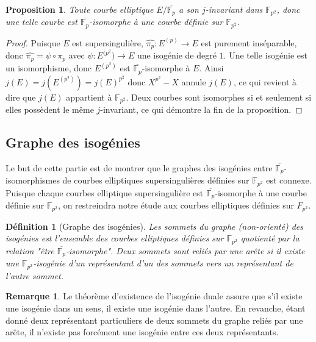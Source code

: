 \documentclass{article}
\theoremstyle{plain}%
\newtheorem{prop}[thm]{Proposition}
\newtheorem{deff}[thm]{Définition}
\theoremstyle{definition}%
\newtheorem{rem}[thm]{Remarque}
\newcommand{\F}{\mathbb{F}}
\newcommand{\h}{\widehat}
\newcommand{\ol}{\overline}
\begin{document}
\begin{prop}
  \label{j-p2}
  Toute courbe elliptique $E/\overline{\F_p}$ a son $j$-invariant dans $\F_{p^2}$, donc une telle courbe est $\overline{\F_p}$-isomorphe à une courbe définie sur $\F_{p^2}$. 
\end{prop}

\begin{proof}
  Puisque $E$ est supersingulière, $\h{\pi_p} : E^{(p)} \to  E$ est purement inséparable, donc $\h{\pi_p} = \psi \circ \pi_p$ avec $\psi : E^{(p^2}) \to E$ une isogénie de degré $1$. Une telle isogénie est un isomorphisme, donc $ E^{(p^2)} $ est $\ol{\F_p}$-isomorphe à $E$. Ainsi $j(E) = j( E^{(p^2)} ) = j(E)^{p^2}$ donc $X^{p^2} - X$ annule $j(E)$, ce qui revient à dire que $j(E)$ appartient à $\F_{p^2}$.
Deux courbes sont isomorphes si et seulement si elles possèdent le même $j$-invariant, ce qui démontre la fin de la proposition.
\end{proof}

\subsection{Graphe des isogénies}

Le but de cette partie est de montrer que le graphes des isogénies entre $\overline{\F_p}$-isomorphismes de courbes elliptiques supersingulières définies sur $\F_{p^2}$ est connexe. Puisque chaque courbes elliptique supersingulière est $\ol{\F_p}$-isomorphe à une courbe définie sur $\F_{p^2}$, on restreindra notre étude aux courbes elliptiques définies sur $F_{p^2}$.


\begin{deff}[Graphe des isogénies]
  Les sommets du graphe (non-orienté) des isogénies est l'ensemble des courbes elliptiques définies sur $\F_{p^2}$ quotienté par la relation "être $\ol{\F_p}$-isomorphe". Deux sommets sont reliés par une arête si il existe une $\F_{p^2}$-isogénie d'un représentant d'un des sommets vers un représentant de l'autre sommet.
\end{deff}

\begin{rem}
  Le théorème d'existence de l'isogénie duale assure que s'il existe une isogénie dans un sens, il existe une isogénie dans l'autre. En revanche, étant donné deux représentant particuliers de deux sommets du graphe reliés par une arête, il n'existe pas forcément une isogénie entre ces deux représentants.
\end{rem}
\end{document}
